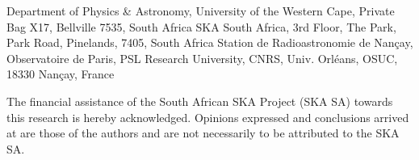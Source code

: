 Department of Physics \& Astronomy, University of the Western Cape, Private Bag X17, Bellville 7535, South Africa
SKA South Africa, 3rd Floor, The Park, Park Road, Pinelands, 7405, South Africa
Station de Radioastronomie de Nan\c{c}ay, Observatoire de Paris, PSL Research University, CNRS, Univ. Orl\'{e}ans, OSUC, 18330 Nan\c{c}ay, France

The financial assistance of the South African SKA Project (SKA SA) towards this research is hereby acknowledged. Opinions expressed and conclusions arrived at are those of the authors and are not necessarily to be attributed to the SKA SA.
